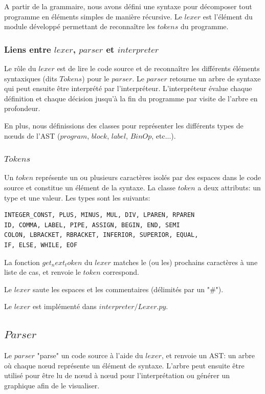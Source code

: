 \documentclass[a4paper]{article}
\begin{document}
A partir de la grammaire, nous avons défini une syntaxe pour décomposer tout programme en éléments simples de manière récursive. Le $lexer$ est l'élément du module développé permettant de reconnaître les $tokens$ du programme. 

\subsubsection{Liens entre $lexer$, $parser$ et $interpreter$}

Le rôle du $lexer$ est de lire le code source et de reconnaître les différents éléments syntaxiques (dits $Tokens$) pour le $parser$. Le $parser$ retourne un arbre de syntaxe qui peut ensuite être interprété par l’interpréteur. L'interpréteur évalue chaque définition et chaque décision jusqu'à la fin du programme par visite de l'arbre en profondeur. 

En plus, nous définissions des classes pour représenter les différents types de nœuds de l'AST ($program$, $block$, $label$, $BinOp$, etc...). 

\subsubsection{$Tokens$}

Un $token$ représente un ou plusieurs caractères isolés par des espaces dans le code source et constitue un élément de la syntaxe. La classe $token$ a deux attributs: un type et une valeur. Les types sont les suivants: 
\begin{verbatim}
INTEGER_CONST, PLUS, MINUS, MUL, DIV, LPAREN, RPAREN      
ID, COMMA, LABEL, PIPE, ASSIGN, BEGIN, END, SEMI 
COLON, LBRACKET, RBRACKET, INFERIOR, SUPERIOR, EQUAL, 
IF, ELSE, WHILE, EOF
\end{verbatim}
La fonction $get_next_token$ du $lexer$ matches le (ou les) prochains caractères à une liste de cas, et renvoie le $token$ correspond. 

Le $lexer$ saute les espaces et les commentaires (délimités par un "\#"). 

Le $lexer$ est implémenté dans $interpreter/Lexer.py$. 

\subsection{$Parser$}

Le $parser$ "parse" un code source à l'aide du $lexer$, et renvoie un AST: un arbre où chaque nœud représente un élément de syntaxe. L'arbre peut ensuite être utilisé pour être lu de nœud à nœud pour l'interprétation ou générer un graphique afin de le visualiser.
\end{document}
